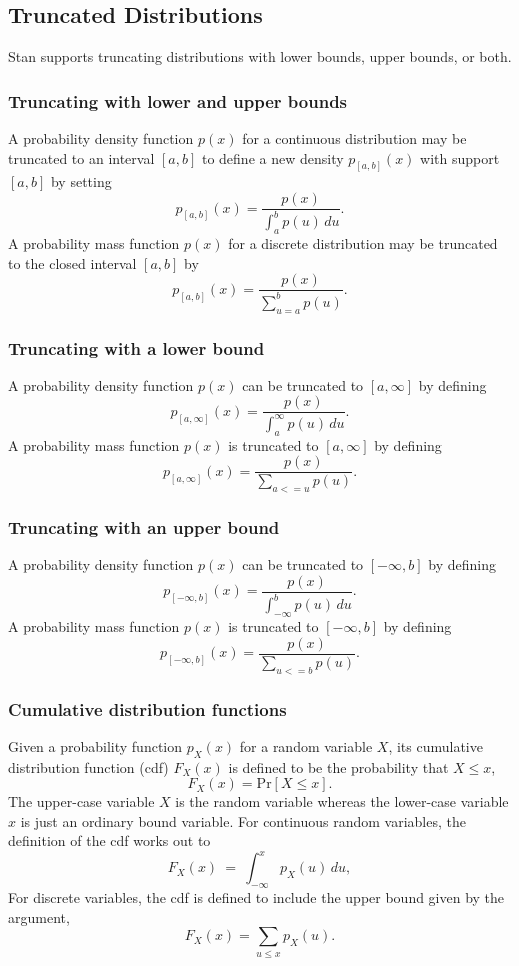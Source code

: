 \subsection{Truncated Distributions}

Stan supports truncating distributions with lower bounds, upper
bounds, or both.

\subsubsection{Truncating with lower and upper bounds}

A probability density function $p(x)$ for a continuous distribution
may be truncated to an interval $[a, b]$ to define a new density
$p_{[a, b]}(x)$ with support $[a, b]$ by setting
%
\[
p_{[a, b]}(x)
= \frac{p(x)}
       {\int_a^b p(u) \, du}.
\]
%
A probability mass function $p(x)$ for a discrete distribution may be
truncated to the closed interval $[a, b]$ by
\[
p_{[a, b]}(x) = \frac{p(x)}
                  {\sum_{u = a}^b p(u)}.
\]

\subsubsection{Truncating with a lower bound}

A probability density function $p(x)$ can be truncated to $[a, \infty]$ by
defining
%
\[
p_{[a, \infty]}(x)
= \frac{p(x)}
       {\int_a^{\infty} p(u) \, du}.
\]
%
A probability mass function $p(x)$ is truncated to $[a, \infty]$ by
defining
%
\[
p_{[a, \infty]}(x) = \frac{p(x)}
                  {\sum_{a <= u} p(u)}.
\]

\subsubsection{Truncating with an upper bound}

A probability density function $p(x)$ can be truncated to $[-\infty, b]$ by
defining
%
\[
p_{[-\infty, b]}(x)
= \frac{p(x)}
       {\int_{-\infty}^b p(u) \, du}.
\]
%
A probability mass function $p(x)$ is truncated to $[-\infty, b]$ by
defining
%
\[
p_{[-\infty,b]}(x) = \frac{p(x)}
                  {\sum_{u <= b} p(u)}.
\]


\subsubsection{Cumulative distribution functions}

Given a probability function $p_X(x)$ for a random variable $X$, its
cumulative distribution function (cdf) $F_X(x)$ is defined to be the
probability that $X \leq x$,
%
\[
F_X(x) = \mbox{Pr}[X \leq x].
\]
The upper-case variable $X$ is the random variable whereas the
lower-case variable $x$ is just an ordinary bound variable.  For
continuous random variables, the definition of the cdf works out to
\[
F_X(x) \ = \ \int_{-\infty}^{x} p_X(u) \, du,
\]
For discrete variables, the cdf is defined to include the upper bound
given by the argument,
\[
F_X(x) = \sum_{u \leq x} p_X(u).
\]
%


